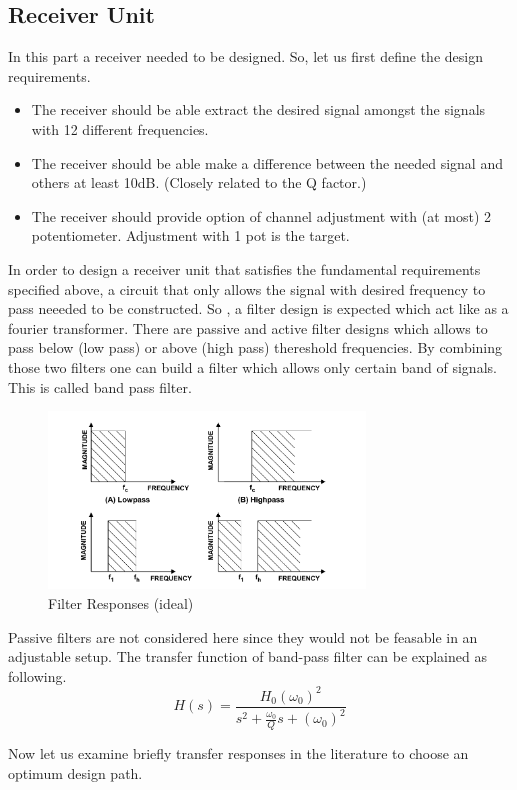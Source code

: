 \documentclass[letterpaper,12pt]{article}
\begin{document}
\subsection{Receiver Unit}
In this part a receiver needed to be designed. So, let us first define the design requirements.
\begin{itemize}
    \item The receiver should be able extract the desired signal amongst the signals with 12 different frequencies.
    \item The receiver should be able make a difference between the needed signal and others at least 10dB. (Closely related to the Q factor.)
    \item The receiver should provide option of channel adjustment with (at most) 2 potentiometer. Adjustment with 1 pot is the target. 
\end{itemize}
In order to design a receiver unit that satisfies the fundamental requirements specified above, a circuit that only allows the signal with desired frequency to pass neeeded to be constructed. So , a filter design is expected which act like as a fourier transformer. There are passive and active filter designs which allows to pass below (low pass) or above (high pass) thereshold frequencies. By combining those two filters one can build a filter which allows only certain band of signals. This is called band pass filter.
\begin{figure}[H]
    \centering
    \includegraphics[width = 0.75\textwidth]{bandpass.png}
    \caption{Filter Responses (ideal)}
\end{figure} 
Passive filters are not considered here since they would not be feasable in an adjustable setup. The transfer function of band-pass filter can be explained as following.
\[
H(s) = \frac{H_0 (\omega_0)^2}{s^2 + \frac{\omega_0}{Q} s  + (\omega_0)^2}    
\]

Now let us examine briefly transfer responses in the literature to choose an optimum design path.
\end{document}
